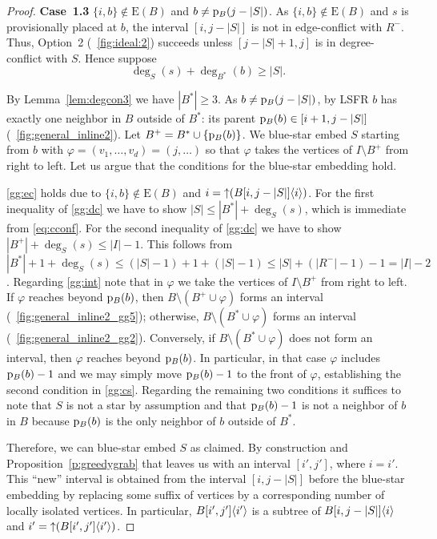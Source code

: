 \documentclass[11pt,a4paper,colorlinks=true,urlcolor=blue,citecolor=red]{article}
\theoremstyle{plain}
\newcommand{\case}[1]{\par\vspace{.5\baselineskip}\noindent\textbf{\sffamily Case~#1}}
\newcommand{\EB}{\mathrm{E}(B)}
\begin{document}
\begin{proof}
  \case{1.3} $\{i,b\}\notin\EB$ and $b\ne\mathrm p_B(j-|S|)$. As
  $\{i,b\}\notin\EB$ and $s$ is provisionally placed at
  $b$, the interval $[i,j-|S|]$
  is not in edge-conflict with $R^-$.
  Thus, Option~2 (\figurename~\ref{fig:ideal:2}) succeeds unless
  $[j-|S|+1,j]$ is in degree-conflict with $S$. Hence suppose
\begin{equation}\label{eq:cconf}
    \deg_S(s)+\deg_{B^*}(b)\ge|S|.
  \end{equation}


  By Lemma~\ref{lem:degcon3} we have $|B^*|\ge 3$. As $b\ne\mathrm p_B(j-|S|)$, by LSFR $b$ has exactly one neighbor in $B$
  outside of $B^*$: its parent $\mathrm p_B(b)\in[i+1,j-|S|]$
  (\figurename~\ref{fig:general_inline2}). Let
  $B^+=B^*\cup\{\mathrm p_B(b)\}$. We blue-star embed $S$ starting from $b$
  with $\varphi=(v_1,\ldots,v_d)=(j,\ldots)$ so that $\varphi$ takes the
  vertices of $I\setminus B^+$ from right to left. Let us argue that the
  conditions for the blue-star embedding hold.

  \ref{gg:ec} holds due to $\{i,b\}\notin\EB$ and
  $i=\mathop{\uparrow}(B{[i,j-|S|]}\langle{i}\rangle)$. For the first inequality of
  \ref{gg:dc} we have to show $|S|\le|B^*|+\deg_S(s)$, which is
  immediate from \eqref{eq:cconf}. For the second inequality of
  \ref{gg:dc} we have to show $|B^+|+\deg_S(s)\le|I|-1$. This follows
  from
  $|B^*|+1+\deg_S(s)\le(|S|-1)+1+(|S|-1)\le|S|+(|R^-|-1)-1=|I|-2$. Regarding
  \ref{gg:int} note that in $\varphi$ we take the vertices of
  $I\setminus B^+$ from right to left. If $\varphi$ reaches beyond
  $\mathrm p_B(b)$, then $B\setminus(B^+\cup\varphi)$ forms an interval
  (\figurename~\ref{fig:general_inline2_gg5}); otherwise,
  $B\setminus(B^*\cup\varphi)$ forms an interval
  (\figurename~\ref{fig:general_inline2_gg2}).  Conversely, if
  $B\setminus(B^*\cup\varphi)$ does not form an interval, then $\varphi$
  reaches beyond $\mathrm p_B(b)$. In particular, in that case $\varphi$
  includes $\mathrm p_B(b)-1$ and we may simply move $\mathrm p_B(b)-1$ to the front
  of $\varphi$, establishing the second condition in
  \ref{gg:cs}. Regarding the remaining two conditions it suffices to
  note that $S$ is not a star by assumption and that $\mathrm p_B(b)-1$ is not
  a neighbor of $b$ in $B$ because $\mathrm p_B(b)$ is the only neighbor of $b$
  outside of $B^*$.

  Therefore, we can blue-star embed $S$ as claimed. By construction and
  Proposition~\ref{p:greedygrab} that leaves us with an interval
  $[i',j']$, where $i=i'$. This ``new'' interval is obtained from the
  interval $[i,j-|S|]$ before the blue-star embedding by replacing some suffix of vertices by a corresponding number of
  locally isolated vertices. In particular, $B{[i',j']}\langle{i'}\rangle$ is a
  subtree of $B{[i,j-|S|]}\langle{i}\rangle$ and
  $i'=\mathop{\uparrow}(B{[i',j']}\langle{i'}\rangle)$.


\end{proof}
\end{document}
